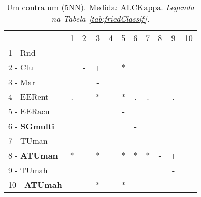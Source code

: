 \begin{table}[h]
\caption{Um contra um (5NN). Medida: ALCKappa. \textit{Legenda na Tabela \ref{tab:friedClassif}.}}
\begin{center}\begin{tabular}{lcc|cc|cc|cc|cc}
 			& 1 & 2 & 3 & 4 & 5 & 6 & 7 & 8 & 9 & 10\\
1 - Rnd  	& - &   &   &   &   &   &   &   &   &   \\
2 - Clu  	&   & - & + &   & * &   &   &   &   &   \\ \hline
3 - Mar  	&   &   & - &   &   &   &   &   &   &   \\
4 - EERent	& . &   & * & - & * & . & . &   & . &   \\ \hline
5 - EERacu	&   &   &   &   & - &   &   &   &   &   \\
6 - \textbf{SGmulti}	&   &   &   &   &   & - &   &   &   &   \\ \hline
7 - TUman	&   &   &   &   &   &   & - &   &   &   \\
8 - \textbf{ATUman}	& * &   & * &   & * & * & * & - & + &   \\ \hline
9 - TUmah	&   &   &   &   &   &   &   &   & - &   \\
10 - \textbf{ATUmah}	&   &   & * &   & * &   &   &   &   & - \\ \hline\end{tabular}
\label{stratsALCKappaFried5NNRedux}
\end{center}
\end{table}